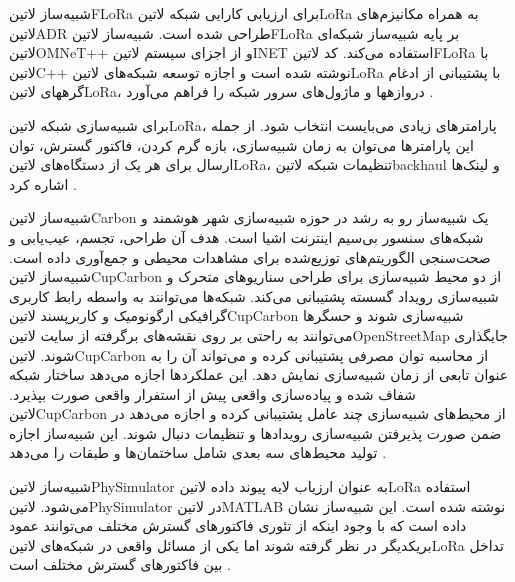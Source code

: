 
شبیه‌ساز ‌لاتین{FLoRa} برای ارزیابی کارایی شبکه ‌لاتین{LoRa} به همراه مکانیزم‌های ‌لاتین{ADR} طراحی شده است.
شبیه‌ساز ‌لاتین{FLoRa} بر پایه شبیه‌ساز شبکه‌ای ‌لاتین{OMNeT++} و از اجزای سیستم ‌لاتین{INET} استفاده می‌کند.
کد ‌لاتین{FLoRa} با ‌لاتین{C++} نوشته شده است و اجازه توسعه شبکه‌های ‌لاتین{LoRa} با پشتیبانی از ادغام
گرههای ‌لاتین{LoRa}، دروازهها و ماژول‌های سرور شبکه را فراهم می‌آورد
.

برای شبیه‌سازی شبکه ‌لاتین{LoRa}، پارامترهای زیادی می‌بایست انتخاب شود.
از جمله این پارامترها می‌توان به زمان شبیه‌سازی، بازه گرم کردن، فاکتور گسترش، توان ارسال برای هر یک از دستگاه‌های ‌لاتین{LoRa}،
تنظیمات شبکه ‌لاتین{backhaul} و لینک‌ها اشاره کرد
.


شبیه‌ساز ‌لاتین{Carbon} یک شبیه‌ساز رو به رشد در حوزه شبیه‌سازی شهر هوشمند و شبکه‌های سنسور بی‌سیم اینترنت اشیا است.
هدف آن طراحی، تجسم، عیب‌یابی و صحت‌سنجی الگوریتم‌های توزیع‌شده برای مشاهدات محیطی و جمع‌آوری داده است.
شبیه‌ساز ‌لاتین{CupCarbon} از دو محیط شبیه‌سازی برای طراحی سناریوهای متحرک و شبیه‌سازی رویداد گسسته پشتیبانی می‌کند.
شبکه‌ها می‌توانند به واسطه رابط کاربری گرافیکی ارگونومیک و کاربرپسند ‌لاتین{CupCarbon} شبیه‌سازی شوند و حسگرها می‌توانند
به راحتی بر روی نقشه‌های برگرفته از سایت ‌لاتین{OpenStreetMap} جایگذاری شوند.
‌لاتین{CupCarbon} از محاسبه توان مصرفی پشتیبانی کرده و می‌تواند آن را به عنوان تابعی از زمان شبیه‌سازی نمایش دهد.
این عملکردها اجازه می‌دهد ساختار شبکه شفاف شده و پیاده‌سازی واقعی پیش از استفرار واقعی صورت بپذیرد.
‌لاتین{CupCarbon} از محیط‌های شبیه‌سازی چند عامل پشتیبانی کرده و اجازه می‌دهد در ضمن صورت پذیرفتن شبیه‌سازی رویدادها و
تنظیمات دنبال شوند.
این شبیه‌ساز اجازه تولید محیط‌های سه بعدی شامل ساختمان‌ها و طبقات را می‌دهد
.


شبیه‌ساز ‌لاتین{PhySimulator} به عنوان ارزیاب لایه پیوند داده ‌لاتین{LoRa} استفاده می‌شود.
‌لاتین{PhySimulator} در ‌لاتین{MATLAB} نوشته شده است.
این شبیه‌ساز نشان داده است که با وجود اینکه از تئوری فاکتورهای گسترش مختلف می‌توانند عمود بریکدیگر در نظر گرفته شوند
اما یکی از مسائل واقعی در شبکه‌های ‌لاتین{LoRa} تداخل بین فاکتورهای گسترش مختلف است
.


